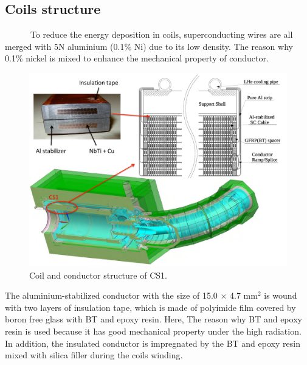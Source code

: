 \subsection{Coils structure}
~~~~~~To reduce the energy deposition in coils, superconducting wires are all merged with 5N aluminium (0.1\% Ni) due to its low density.
The reason why 
0.1\% nickel is mixed to enhance the mechanical property of conductor.
\begin{figure}[H]
 \centering
 \includegraphics[scale=0.45]{chapter2/fig/coil.pdf}
 \caption{ Coil and conductor structure of CS1.}
 \label{cssrtu}
\end{figure}

The aluminium-stabilized conductor with the size of 15.0 $\times$ 4.7 mm$^2$ is wound with two layers of insulation tape, which is made of polyimide film covered by boron free glass with BT and epoxy resin.
Here, The reason why BT and epoxy resin is used because it has good mechanical property under the high radiation.
In addition, the insulated conductor is impregnated by the BT and epoxy resin mixed with silica filler during the coils winding.

